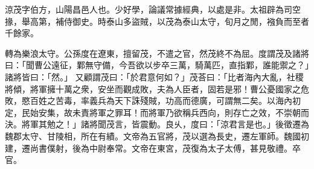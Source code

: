 \begin{pinyinscope}
 
 
 涼茂字伯方，山陽昌邑人也。少好學，論議常據經典，以處是非。太祖辟為司空掾，舉高第，補侍御史。時泰山多盜賊，以茂為泰山太守，旬月之閒，襁負而至者千餘家。
 
 
 轉為樂浪太守。公孫度在遼東，擅留茂，不遣之官，然茂終不為屈。度謂茂及諸將曰：「聞曹公遠征，鄴無守備，今吾欲以步卒三萬，騎萬匹，直指鄴，誰能禦之？」諸將皆曰：「然。」
 又顧謂茂曰：「於君意何如？」茂荅曰：「比者海內大亂，社稷將傾，將軍擁十萬之衆，安坐而觀成敗，夫為人臣者，固若是邪！曹公憂國家之危敗，愍百姓之苦毒，率義兵為天下誅殘賊，功高而德廣，可謂無二矣。以海內初定，民始安集，故未責將軍之罪耳！而將軍乃欲稱兵西向，則存亡之效，不崇朝而決。將軍其勉之！」諸將聞茂言，皆震動。良乆，度曰：「涼君言是也。」後徵遷為魏郡太守、甘陵相，所在有績。文帝為五官將，茂以選為長史，遷左軍師。魏國初建，遷尚書僕射，後為中尉奉常。文帝在東宮，茂復為太子太傅，甚見敬禮。卒官。
 
 
\end{pinyinscope}